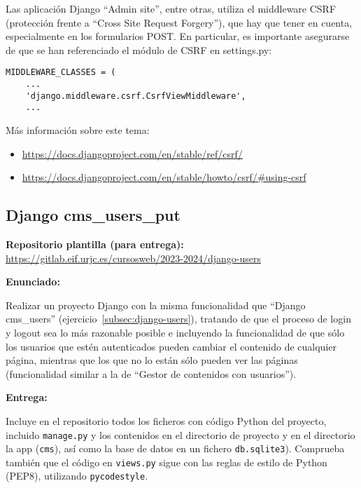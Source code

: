 Las aplicación Django ``Admin site'', entre otras, utiliza el middleware CSRF (protección frente a ``Cross Site Request Forgery''), que hay que tener en cuenta, especialmente en los formularios POST. En particular, es importante asegurarse de que se han referenciado el módulo de CSRF en settings.py:

\begin{verbatim}
MIDDLEWARE_CLASSES = (
    ...
    'django.middleware.csrf.CsrfViewMiddleware',
    ...
\end{verbatim}

Más información sobre este tema: \\

\begin{itemize}
\item \url{https://docs.djangoproject.com/en/stable/ref/csrf/}
\item \url{https://docs.djangoproject.com/en/stable/howto/csrf/#using-csrf}
\end{itemize}

\subsection{Django cms\_users\_put}
\label{subsec:django-users-put}

\textbf{Repositorio plantilla (para entrega):} \\
\url{https://gitlab.eif.urjc.es/cursosweb/2023-2024/django-users}

\textbf{Enunciado:}

Realizar un proyecto Django con la misma funcionalidad que ``Django cms\_users'' (ejercicio~\ref{subsec:django-users}), tratando de que el proceso de login y logout sea lo más razonable posible e incluyendo la funcionalidad de que sólo los usuarios que estén autenticados pueden cambiar el contenido de cualquier página, mientras que los que no lo están sólo pueden ver las páginas (funcionalidad similar a la de ``Gestor de contenidos con usuarios'').

\textbf{Entrega:}

Incluye en el repositorio todos los ficheros con código Python del proyecto, incluido \texttt{manage.py} y los contenidos en el directorio de proyecto y en el directorio la app (\texttt{cms}), así como la base de datos en un fichero \texttt{db.sqlite3}). Comprueba también que el código en \texttt{views.py} sigue con las reglas de estilo de Python (PEP8), utilizando \texttt{pycodestyle}.


